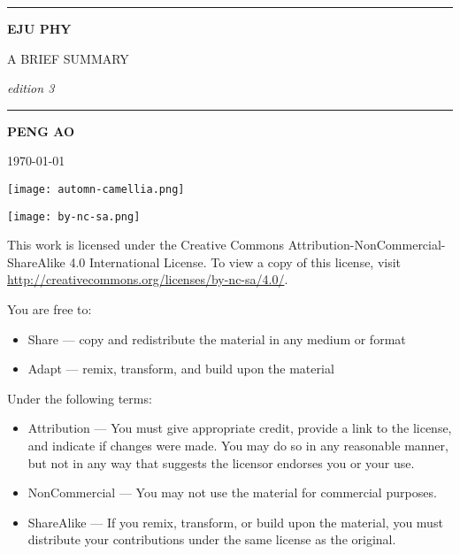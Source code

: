
\begin{titlepage}
    \begin{center}
        \vspace{4cm}
        
        \rule{\textwidth}{1.2pt}
        
        \vspace{0.3cm}

        {\Huge \textbf{EJU PHY}}

        \vspace{0.3cm}

        {\LARGE A BRIEF SUMMARY}

        \vspace{0.3cm}

        {\Large \textit{edition 3}}

        \rule{\textwidth}{1.2pt}

        \vspace{2cm}

        {\LARGE \textbf{PENG AO}}

        \vspace{0.5cm}
        {\Large \today}

        \vfill

        \texttt{[image: automn-camellia.png]}
    \end{center}
\end{titlepage}


\clearpage
\begin{flushleft}
    \null

    \vfill
    \texttt{[image: by-nc-sa.png]}

    This work is licensed under the Creative Commons Attribution-NonCommercial-ShareAlike 4.0 International License. To view a copy of this license, visit \url{http://creativecommons.org/licenses/by-nc-sa/4.0/}.

    \vspace{1em}
    You are free to:
    \begin{itemize}
        \item Share — copy and redistribute the material in any medium or format
        \item Adapt — remix, transform, and build upon the material
    \end{itemize}

    Under the following terms:
    \begin{itemize}
        \item Attribution — You must give appropriate credit, provide a link to the license, and indicate if changes were made. You may do so in any reasonable manner, but not in any way that suggests the licensor endorses you or your use.
        \item NonCommercial — You may not use the material for commercial purposes.
        \item ShareAlike — If you remix, transform, or build upon the material, you must distribute your contributions under the same license as the original.
    \end{itemize}
\end{flushleft}


